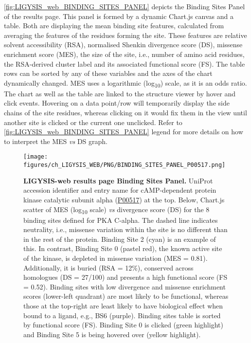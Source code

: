 \autoref{fig:LIGYSIS_web_BINDING_SITES_PANEL} depicts the Binding Sites Panel of the results page. This panel is formed by a dynamic Chart.js canvas and a table. Both are displaying the mean binding site features, calculated from averaging the features of the residues forming the site. These features are relative solvent accessibility (RSA), normalised Shenkin divergence score (DS), missense enrichment score (MES), the size of the site, i.e., number of amino acid residues, the RSA-derived cluster label and its associated functional score (FS). The table rows can be sorted by any of these variables and the axes of the chart dynamically changed. MES uses a logarithmic (log\textsubscript{10}) scale, as it is an odds ratio. The chart as well as the table are linked to the structure viewer by hover and click events. Hovering on a data point/row will temporarily display the side chains of the site residues, whereas clicking on it would fix them in the view until another site is clicked or the current one unclicked. Refer to \autoref{fig:LIGYSIS_web_BINDING_SITES_PANEL} legend for more details on how to interpret the MES \textit{vs} DS graph.

\begin{figure}[htb!]
    \centering
    \texttt{[image: figures/ch\_LIGYSIS\_WEB/PNG/BINDING\_SITES\_PANEL\_P00517.png]}
    \caption[LIGYSIS-web results page Binding Sites Panel]{\textbf{LIGYSIS-web results page Binding Sites Panel.} UniProt accession identifier and entry name for cAMP-dependent protein kinase catalytic subunit alpha (\href{https://www.uniprot.org/uniprotkb/P00517/entry}{P00517}) at the top. Below, Chart.js scatter of MES (log\textsubscript{10} scale) \textit{vs} divergence score (DS) for the 8 binding sites defined for PKA C-alpha. The dashed line indicates neutrality, i.e., missense variation within the site is no different than in the rest of the protein. Binding Site 2 (cyan) is an example of this. In contrast, Binding Site 0 (pastel red), the known active site of the kinase, is depleted in missense variation (MES = 0.81). Additionally, it is buried (RSA = 12\%), conserved across homologues (DS = 27/100) and presents a high functional score (FS = 0.52). Binding sites with low divergence and missense enrichment scores (lower-left quadrant) are most likely to be functional, whereas those at the top-right are least likely to have biological effect when bound to a ligand, e.g., BS6 (purple). Binding sites table is sorted by functional score (FS). Binding Site 0 is clicked (green highlight) and Binding Site 5 is being hovered over (yellow highlight).}
    \label{fig:LIGYSIS_web_BINDING_SITES_PANEL}
\end{figure}

